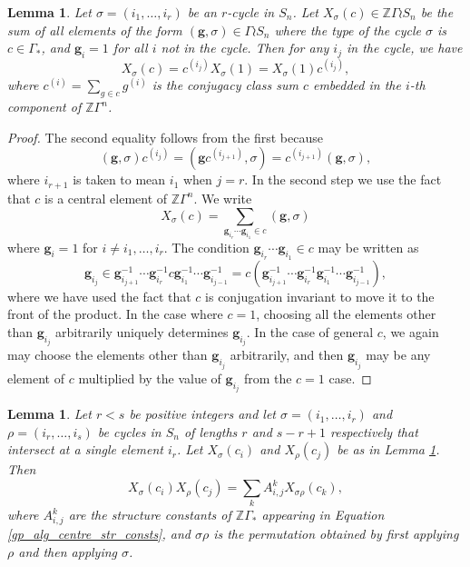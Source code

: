 \documentclass[10pt]{article}
\newtheorem{lemma}[theorem]{Lemma}
\theoremstyle{definition}
\begin{document}
\begin{lemma} \label{cycle_label_compatibility}
Let $\sigma = (i_1, \ldots, i_r)$ be an $r$-cycle in $S_n$. Let $X_\sigma(c) \in \mathbb{Z}\Gamma \wr S_n$ be the sum of all elements of the form $(\mathbf{g}, \sigma) \in \Gamma \wr S_n$ where the type of the cycle $\sigma$ is $c \in \Gamma_*$, and $\mathbf{g}_i = 1$ for all $i$ not in the cycle. Then for any $i_j$ in the cycle, we have
\[
X_\sigma(c) = c^{(i_j)}X_\sigma(1) = X_\sigma(1) c^{(i_j)},
\]
where $c^{(i)} = \sum_{g \in c} g^{(i)}$ is the conjugacy class sum $c$ embedded in the $i$-th component of $\mathbb{Z}\Gamma^n$. 
\end{lemma}
\begin{proof}
The second equality follows from the first because
\[
(\mathbf{g}, \sigma) c^{(i_j)}  = (\mathbf{g}c^{(i_{j+1})}, \sigma) = c^{(i_{j+1})}(\mathbf{g}, \sigma),
\]
where $i_{r+1}$ is taken to mean $i_1$ when $j=r$. In the second step we use the fact that $c$ is a central element of $\mathbb{Z}\Gamma^n$. We write
\[
X_\sigma(c) = \sum_{\mathbf{g}_{i_r} \cdots \mathbf{g}_{i_1} \in c} (\mathbf{g}, \sigma)
\]
where $\mathbf{g}_i = 1$ for $i \neq i_1, \ldots, i_r$. The condition $\mathbf{g}_{i_r} \cdots \mathbf{g}_{i_1} \in c$ may be written as
\[
\mathbf{g}_{i_j} \in \mathbf{g}_{i_{j+1}}^{-1} \cdots \mathbf{g}_{i_{r}}^{-1}c\mathbf{g}_{i_1}^{-1} \cdots \mathbf{g}_{i_{j-1}}^{-1} = c (\mathbf{g}_{i_{j+1}}^{-1} \cdots \mathbf{g}_{i_{r}}^{-1}\mathbf{g}_{i_1}^{-1} \cdots \mathbf{g}_{i_{j-1}}^{-1}),
\]
where we have used the fact that $c$ is conjugation invariant to move it to the front of the product. In the case where $c=1$, choosing all the elements other than $\mathbf{g}_{i_j}$ arbitrarily uniquely determines $\mathbf{g}_{i_j}$. In the case of general $c$, we again may choose the elements other than $\mathbf{g}_{i_j}$ arbitrarily, and then $\mathbf{g}_{i_j}$ may be any element of $c$ multiplied by the value of $\mathbf{g}_{i_j}$ from the $c=1$ case.
\end{proof}
\begin{lemma} \label{cycle_label_product}
Let $r<s$ be positive integers and let $\sigma = (i_1, \ldots, i_r)$ and $\rho = (i_r, \ldots, i_s)$ be cycles in $S_n$ of lengths $r$ and $s-r+1$ respectively that intersect at a single element $i_r$. Let $X_\sigma(c_i)$ and $X_\rho(c_j)$ be as in Lemma \ref{cycle_label_compatibility}. Then
\[
X_\sigma(c_i) X_\rho(c_j) = \sum_{k} A_{i,j}^k X_{\sigma\rho}(c_k),
\]
where $A_{i,j}^k$ are the structure constants of $\mathbb{Z}\Gamma_*$ appearing in Equation \eqref{gp_alg_centre_str_consts}, and $\sigma \rho$ is the permutation obtained by first applying $\rho$ and then applying $\sigma$.
\end{lemma}
\end{document}
